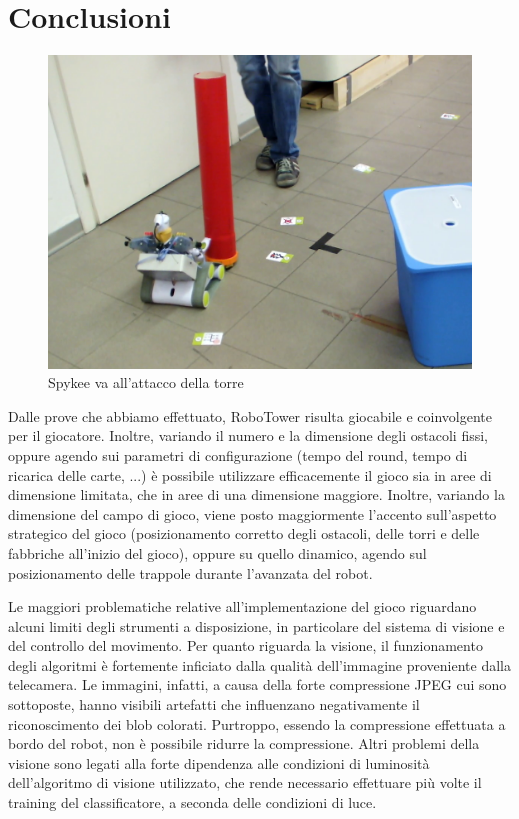 \chapter{Conclusioni}
\label{cap:conclusioni}

\begin{figure}
\centering
\includegraphics[scale=0.3]{images/attaccotorre}
\caption{Spykee va all'attacco della torre}
\end{figure}

Dalle prove che abbiamo effettuato, RoboTower risulta giocabile e coinvolgente per il giocatore. Inoltre, variando il numero e la dimensione degli ostacoli fissi, oppure agendo sui parametri di configurazione (tempo del round, tempo di ricarica delle carte, ...) è possibile utilizzare efficacemente il gioco sia in aree di dimensione limitata, che in aree di una dimensione maggiore. Inoltre, variando la dimensione del campo di gioco, viene posto maggiormente l'accento sull'aspetto strategico del gioco (posizionamento corretto degli ostacoli, delle torri e delle fabbriche all'inizio del gioco), oppure su quello dinamico, agendo sul posizionamento delle trappole durante l'avanzata del robot.

Le maggiori problematiche relative all'implementazione del gioco riguardano alcuni limiti degli strumenti a disposizione, in particolare del sistema di visione e del controllo del movimento. Per quanto riguarda la visione, il funzionamento degli algoritmi è fortemente inficiato dalla qualità dell'immagine proveniente dalla telecamera. Le immagini, infatti, a causa della forte compressione JPEG cui sono sottoposte, hanno visibili artefatti che influenzano negativamente il riconoscimento dei blob colorati. Purtroppo, essendo la compressione effettuata a bordo del robot, non è possibile ridurre la compressione. Altri problemi della visione sono legati alla forte dipendenza alle condizioni di luminosità dell'algoritmo di visione utilizzato, che rende necessario effettuare più volte il training del classificatore, a seconda delle condizioni di luce.

